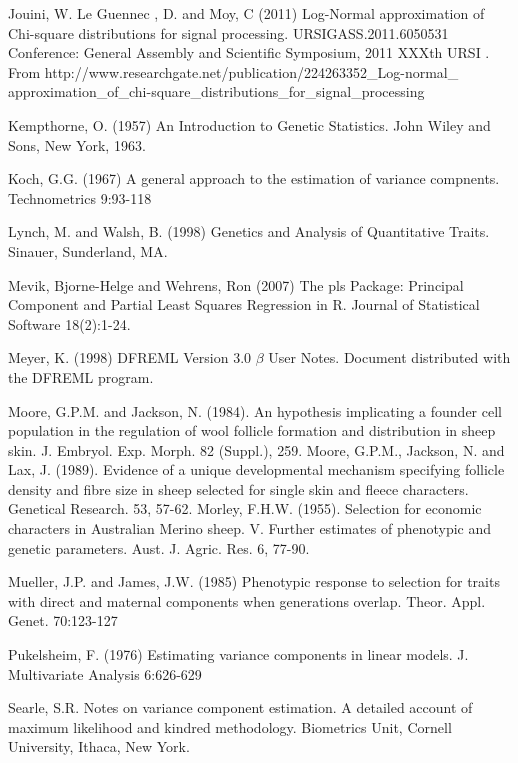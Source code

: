 \documentclass[titlepage]{article}  %
\begin{document}
\begin{thebibliography}{99}
Jouini, W. Le Guennec , D. and Moy, C  (2011) Log-Normal approximation of
    Chi-square distributions for signal processing. 
    URSIGASS.2011.6050531 Conference: General Assembly and Scientific Symposium,
    2011 XXXth URSI .
    From http://www.researchgate.net/publication/224263352\_Log-normal\_
    approximation\_of\_chi-square\_distributions\_for\_signal\_processing

Kempthorne, O. (1957) An Introduction to Genetic Statistics.
    John Wiley and Sons, New York, 1963.

Koch, G.G. (1967) A general approach to the estimation of variance compnents. 
    Technometrics 9:93-118

Lynch, M. and Walsh, B. (1998) Genetics and Analysis of Quantitative Traits. 
    Sinauer, Sunderland, MA.

Mevik, Bjorne-Helge and Wehrens, Ron (2007) The pls Package: Principal 
    Component and Partial Least Squares Regression in R.
    Journal of Statistical Software 18(2):1-24.

Meyer, K. (1998) DFREML Version 3.0 $\beta$ User Notes. Document distributed
    with the DFREML program.

Moore, G.P.M. and Jackson, N. (1984).  An hypothesis implicating a founder
    cell population in the regulation of wool follicle formation and
    distribution in sheep skin.  J. Embryol. Exp. Morph. 82 (Suppl.), 259.
Moore, G.P.M., Jackson, N. and Lax, J. (1989).  Evidence of a unique
    developmental mechanism specifying follicle density and fibre size in
    sheep selected for single skin and fleece characters.  Genetical
    Research.  53, 57-62.
Morley, F.H.W. (1955).  Selection for economic characters in Australian
    Merino sheep.  V. Further estimates of phenotypic and genetic
    parameters.  Aust. J. Agric. Res. 6, 77-90.

Mueller, J.P. and James, J.W. (1985) Phenotypic response to selection for
    traits with direct and maternal components when generations overlap.
    Theor. Appl. Genet. 70:123-127

Pukelsheim, F. (1976) Estimating variance components in linear models.
    J. Multivariate Analysis 6:626-629

Searle, S.R. Notes on variance component estimation. A detailed account of 
    maximum likelihood and kindred methodology. Biometrics Unit, Cornell
    University, Ithaca, New York.


\end{thebibliography}
\end{document}
